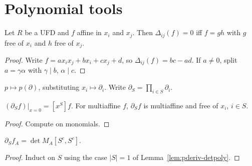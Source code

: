 \chapter{Polynomial tools}

\begin{lemma}
\label{lem:22}
\leanok
{}
Let $R$ be a UFD and $f$ affine in $x_i$ and $x_j$. Then $\Delta_{ij}(f)=0$ iff $f=gh$ with
$g$ free of $x_i$ and $h$ free of $x_j$.
\end{lemma}

\begin{proof}
\leanok
Write $f=ax_ix_j+bx_i+cx_j+d$, so $\Delta_{ij}(f)=bc-ad$. If $a\ne0$, split $a=\gamma\alpha$
with $\gamma\mid b$, $\alpha\mid c$.
\end{proof}

\begin{definition}
\label{def:pderivOp}
\leanok
$p\mapsto p(\partial)$, substituting $x_i\mapsto\partial_i$. Write
$\partial_S=\prod_{i\in S}\partial_i$.
\end{definition}

\begin{lemma}
\label{lem:pderivOp-coeff}
\leanok
{}
$(\partial_Sf)|_{x=0}=[x^S]f$. For multiaffine $f$, $\partial_Sf$ is multiaffine and free of
$x_i$, $i\in S$.
\end{lemma}

\begin{proof}
\leanok
Compute on monomials.
\end{proof}

\begin{lemma}
\label{lem:pderivOp-detpoly}
\leanok
{}
$\partial_Sf_A=\det M_A[S^c,S^c]$.
\end{lemma}

\begin{proof}
Induct on $S$ using the case $|S|=1$ of Lemma~\ref{lem:pderiv-detpoly}.
\end{proof}

